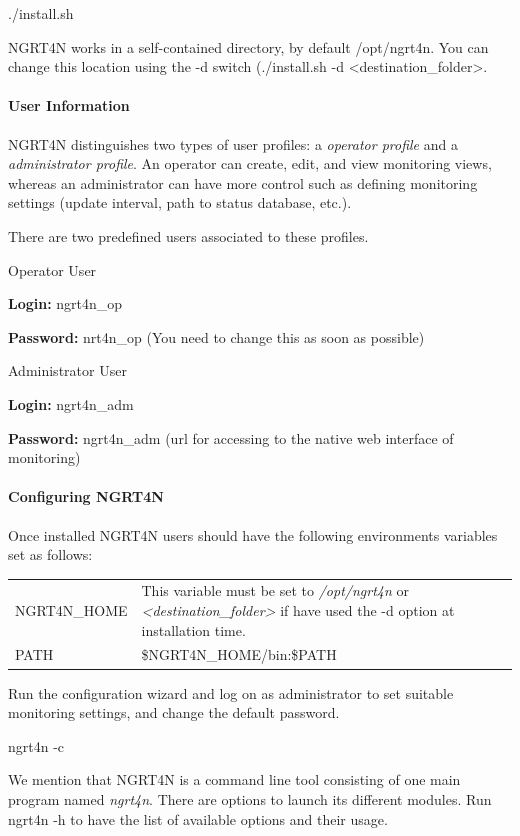 \documentclass[a4paper,9pt]{article}
\begin{document}
./install.sh 

NGRT4N works in a self-contained directory, by default /opt/ngrt4n. You can change this location using the -d switch (./install.sh -d <destination_folder>. 

\paragraph{User Information}
NGRT4N distinguishes two types of user profiles: a \emph{operator profile} and a \emph{administrator profile}. An operator can create, edit, and view monitoring views, whereas an administrator can have more control such as defining monitoring settings (update interval, path to status database, etc.).

There are two predefined users associated to these profiles.

Operator User

{\bf Login:} ngrt4n\_op

{\bf Password:} nrt4n\_op     (You need to change this as soon as possible)

Administrator User

{\bf Login:} ngrt4n\_adm

{\bf Password:} ngrt4n\_adm     (url for accessing to the native web interface of monitoring)

\paragraph{Configuring NGRT4N}

Once installed NGRT4N users should have the following environments variables set as follows:
 
\begin{center}
        \begin{tabular}{p{4cm} p{20cm}}
        NGRT4N\_HOME & This variable must be set to \emph{/opt/ngrt4n} or \emph{<destination\_folder>} if have used the -d option at installation time. \\
        PATH &  \$NGRT4N\_HOME/bin:\$PATH
        \end{tabular}
\end{center}

Run the configuration wizard and log on as administrator to set suitable monitoring settings, and change the default password.

ngrt4n -c

We mention that NGRT4N is a command line tool consisting of one main program named \emph{ngrt4n}. There are options to launch its different modules. Run ngrt4n -h to have the list of available options and their usage. 
\end{document}
